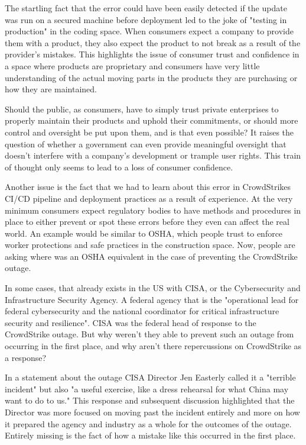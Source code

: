 The startling fact that the error could have been easily detected if the update was run on a secured machine before deployment led to the joke of "testing in production" in the coding space. When consumers expect a company to provide them with a product, they also expect the product to not break as a result of the provider's mistakes. This highlights the issue of consumer trust and confidence in a space where products are proprietary and consumers have very little understanding of the actual moving parts in the products they are purchasing or how they are maintained.

Should the public, as consumers, have to simply trust private enterprises to properly maintain their products and uphold their commitments, or should more control and oversight be put upon them, and is that even possible? It raises the question of whether a government can even provide meaningful oversight that doesn't interfere with a company's development or trample user rights. This train of thought only seems to lead to a loss of consumer confidence.

Another issue is the fact that we had to learn about this error in CrowdStrikes CI/CD pipeline and deployment practices as a result of experience. At the very minimum consumers expect regulatory bodies to have methods and procedures in place to either prevent or spot these errors before they even can affect the real world. An example would be similar to OSHA, which people trust to enforce worker protections and safe practices in the construction space. Now, people are asking where was an OSHA equivalent in the case of preventing the CrowdStrike outage.

In some cases, that already exists in the US with CISA, or the Cybersecurity and Infrastructure Security Agency. A federal agency that is the "operational lead for federal cybersecurity and the national coordinator for critical infrastructure security and resilience". CISA was the federal head of response to the CrowdStrike outage. But why weren't they able to prevent such an outage from occurring in the first place, and why aren't there repercussions on CrowdStrike as a response?

In a statement about the outage CISA Director Jen Easterly called it a "terrible incident" but also "a useful exercise, like a dress rehearsal for what China may want to do to us." This response and subsequent discussion highlighted that the Director was more focused on moving past the incident entirely and more on how it prepared the agency and industry as a whole for the outcomes of the outage. Entirely missing is the fact of how a mistake like this occurred in the first place.

